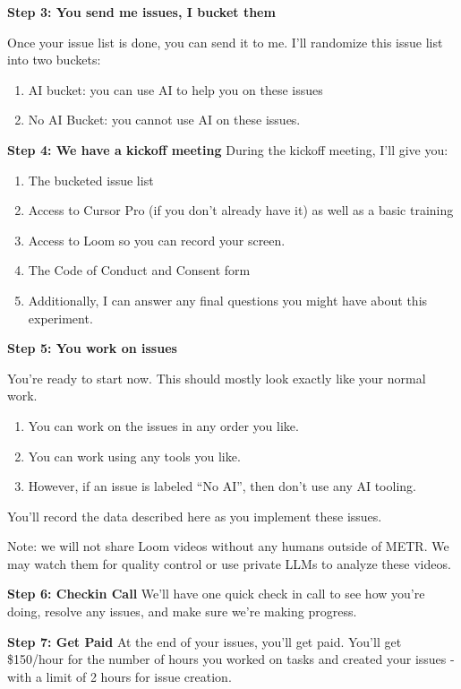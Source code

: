 \documentclass{article}
\begin{document}
\begin{instructionbox}
\textbf{Step 3: You send me issues, I bucket them}

Once your issue list is done, you can send it to me.
I’ll randomize this issue list into two buckets:
\begin{enumerate}
    \item AI bucket: you can use AI to help you on these issues
    \item No AI Bucket: you cannot use AI on these issues.
\end{enumerate}

\textbf{Step 4: We have a kickoff meeting
}
During the kickoff meeting, I’ll give you:
\begin{enumerate}
    \item The bucketed issue list
    \item Access to Cursor Pro (if you don’t already have it) as well as a basic training
    \item Access to Loom so you can record your screen.
    \item The Code of Conduct and Consent form
    \item Additionally, I can answer any final questions you might have about this experiment.
\end{enumerate}

\textbf{Step 5: You work on issues}

You’re ready to start now.  This should mostly look exactly like your normal work.
\begin{enumerate}
    \item You can work on the issues in any order you like. 
    \item You can work using any tools you like.
    \item However, if an issue is labeled “No AI”, then don’t use any AI tooling.
\end{enumerate}

You’ll record the data described here as you implement these issues.

Note: we will not share Loom videos without any humans outside of METR. We may watch them for quality control or use private LLMs to analyze these videos.

\textbf{Step 6: Checkin Call}
We’ll have one quick check in call to see how you’re doing, resolve any issues, and make sure we’re making progress.


\textbf{Step 7: Get Paid}
At the end of your issues, you’ll get paid. You’ll get \$150/hour for the number of hours you worked on tasks and created your issues - with a limit of 2 hours for issue creation. 



\end{instructionbox}
\end{document}
